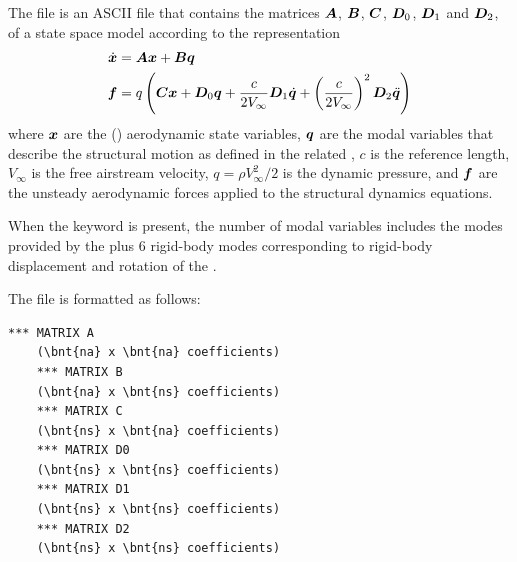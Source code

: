 The  file is an ASCII file that contains
the matrices $\boldsymbol{A}$, $\boldsymbol{B}$, $\boldsymbol{C}$, $\boldsymbol{D}_0$, $\boldsymbol{D}_1$ and $\boldsymbol{D}_2$,
of a state space model according to the representation
\begin{align*}
	\dot{\boldsymbol{x}}
	&=
	\boldsymbol{A}\boldsymbol{x} + \boldsymbol{B}\boldsymbol{q}
	\\
	\boldsymbol{f}
	&=
	q\left( \boldsymbol{C}\boldsymbol{x} + \boldsymbol{D}_0 \boldsymbol{q} + \frac{c}{2V_{\infty}} \boldsymbol{D}_1 \dot{\boldsymbol{q}} + \left( \frac{c}{2V_{\infty}} \right)^2 \boldsymbol{D}_2 \ddot{\boldsymbol{q}} \right)
\end{align*}
where $\boldsymbol{x}$ are the  ()
aerodynamic state variables,
$\boldsymbol{q}$ are the  modal variables that describe the structural motion
as defined in the related ,
$c$ is the reference length, $V_\infty$ is the free airstream velocity,
$q = \rho V_{\infty}^2/2$ is the dynamic pressure,
and $\boldsymbol{f}$ are the unsteady aerodynamic forces applied to the structural
dynamics equations.

When the keyword  is present, the number of modal variables 
includes the modes provided
by the 
plus 6 rigid-body modes corresponding to rigid-body displacement
and rotation of the .

The file is formatted as follows:
\begin{Verbatim}[commandchars=\\\{\}]
    *** MATRIX A
    (\bnt{na} x \bnt{na} coefficients)
    *** MATRIX B
    (\bnt{na} x \bnt{ns} coefficients)
    *** MATRIX C
    (\bnt{ns} x \bnt{na} coefficients)
    *** MATRIX D0
    (\bnt{ns} x \bnt{ns} coefficients)
    *** MATRIX D1
    (\bnt{ns} x \bnt{ns} coefficients)
    *** MATRIX D2
    (\bnt{ns} x \bnt{ns} coefficients)
\end{Verbatim}

